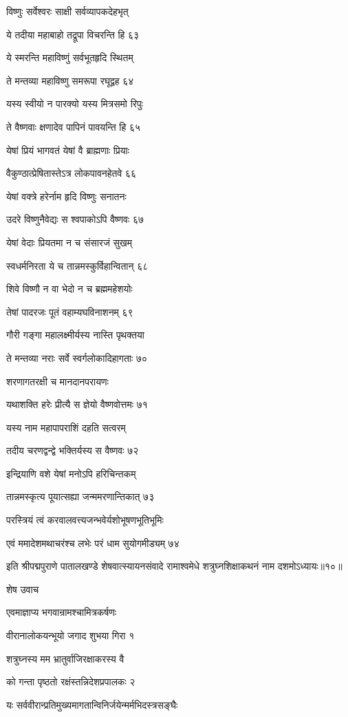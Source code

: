 विष्णुः सर्वेश्वरः साक्षी सर्वव्यापकदेहभृत्

ये तदीया महाबाहो तद्रूपा विचरन्ति हि ६३

ये स्मरन्ति महाविष्णुं सर्वभूतहृदि स्थितम्

ते मन्तव्या महाविष्णु समरूपा रघूद्वह ६४

यस्य स्वीयो न पारक्यो यस्य मित्रसमो रिपुः

ते वैष्णवाः क्षणादेव पापिनं पावयन्ति हि ६५

येषां प्रियं भागवतं येषां वै ब्राह्मणाः प्रियाः

वैकुण्ठात्प्रेषितास्तेऽत्र लोकपावनहेतवे ६६

येषां वक्त्रे हरेर्नाम हृदि विष्णुः सनातनः

उदरे विष्णुनैवेद्यः स श्वपाकोऽपि वैष्णवः ६७

येषां वेदाः प्रियतमा न च संसारजं सुखम्

स्वधर्मनिरता ये च तान्नमस्कुर्विहान्वितान् ६८

शिवे विष्णौ न वा भेदो न च ब्रह्ममहेशयोः

तेषां पादरजः पूतं वहाम्यघविनाशनम् ६९

गौरी गङ्गा महालक्ष्मीर्यस्य नास्ति पृथक्तया

ते मन्तव्या नराः सर्वे स्वर्गलोकादिहागताः ७०

शरणागतरक्षी च मानदानपरायणः

यथाशक्ति हरेः प्रीत्यै स ज्ञेयो वैष्णवोत्तमः ७१

यस्य नाम महापापराशिं दहति सत्वरम्

तदीय चरणद्वन्द्वे भक्तिर्यस्य स वैष्णवः ७२

इन्द्रियाणि वशे येषां मनोऽपि हरिचिन्तकम्

तान्नमस्कृत्य पूयात्सह्या जन्ममरणान्तिकात् ७३

परस्त्रियं त्वं करवालवत्त्यजन्भवेर्यशोभूषणभूतिभूमिः

एवं ममादेशमथाचरंश्च लभेः परं धाम सुयोगमीड्यम् ७४

इति श्रीपद्मपुराणे पातालखण्डे शेषवात्स्यायनसंवादे रामाश्वमेधे शत्रुघ्नशिक्षाकथनं नाम दशमोऽध्यायः॥१०॥


शेष उवाच

एवमाज्ञाप्य भगवान्रामश्चामित्रकर्षणः

वीरानालोकयन्भूयो जगाद शुभया गिरा १

शत्रुघ्नस्य मम भ्रातुर्वाजिरक्षाकरस्य वै

को गन्ता पृष्ठतो रक्षंस्तन्निदेशप्रपालकः २

यः सर्ववीरान्प्रतिमुख्यमागतान्विनिर्जयेन्मर्मभिदस्त्रसङ्घैः

